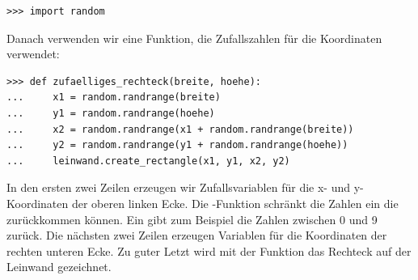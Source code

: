 \begin{Verbatim}[frame=single]
>>> import random
\end{Verbatim}

Danach verwenden wir eine Funktion, die Zufallszahlen für die Koordinaten verwendet:

\begin{Verbatim}[frame=single]
>>> def zufaelliges_rechteck(breite, hoehe):
...     x1 = random.randrange(breite)
...     y1 = random.randrange(hoehe)
...     x2 = random.randrange(x1 + random.randrange(breite))
...     y2 = random.randrange(y1 + random.randrange(hoehe))
...     leinwand.create_rectangle(x1, y1, x2, y2)
\end{Verbatim}

In den ersten zwei Zeilen erzeugen wir Zufallsvariablen für die x- und y-Koordinaten der oberen linken Ecke. Die -Funktion schränkt die Zahlen ein die zurückkommen können. Ein  gibt zum Beispiel die Zahlen zwischen 0 und 9 zurück. Die nächsten zwei Zeilen erzeugen Variablen für die Koordinaten der rechten unteren Ecke. Zu guter Letzt wird mit der  Funktion das Rechteck auf der Leinwand gezeichnet.

